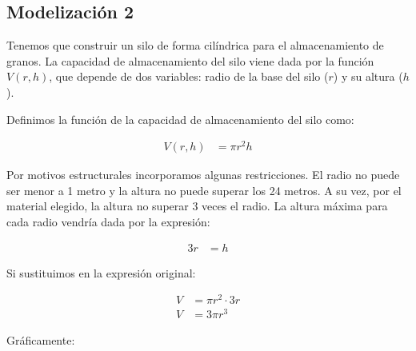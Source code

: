 \subsection*{Modelización 2}

Tenemos que construir un silo de forma cilíndrica para el almacenamiento de granos. La capacidad de almacenamiento del silo viene dada por la función $V(r, h)$, que depende de dos variables: radio de la base del silo ($r$) y su altura ($h$).

\begin{center}
\end{center}

Definimos la función de la capacidad de almacenamiento del silo como:

\begin{align*}
    V(r, h) & = \pi r^2h
\end{align*}

Por motivos estructurales incorporamos algunas restricciones. El radio no puede ser menor a 1 metro y la altura no puede superar los 24 metros. A su vez, por el material elegido, la altura no superar 3 veces el radio. La altura máxima para cada radio vendría dada por la expresión:

\begin{align*}
    3r & = h
\end{align*}

Si sustituimos en la expresión original:

\begin{align*}
    V & = \pi r^2 \cdot 3r \\
    V & = 3 \pi r^3
\end{align*}

Gráficamente:

